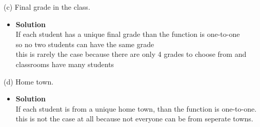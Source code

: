 \documentclass[11pt]{article}
\begin{document}
\begin{enumerate}
\begin{flushleft}
\end{flushleft}


\large (c) Final grade in the class.\\

\begin{itemize}
\item \textbf{Solution}\\
\large If each student has a unique final grade than the function is one-to-one\\
\large so no two students can have the same grade\\
\large this is rarely the case because there are only 4 grades to choose from and classrooms have many students\\

\end {itemize}
\end {enumerate}


\begin{enumerate}
\begin{flushleft}
\end{flushleft}


\large (d) Home town.\\

\begin{itemize}
\item \textbf{Solution}\\
\large If each student is from a unique home town, than the function is one-to-one.\\
\large this is not the case at all because not everyone can be from seperate towns. \\

\end {itemize}
\end {enumerate}





\end{document}
